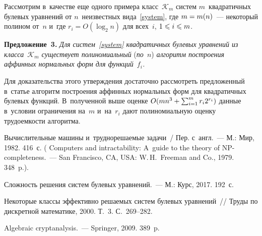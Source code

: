 \begin{multicols}{2}
Рассмотрим в~качестве еще одного примера класс~$\mathcal{K}_m$ систем 
$m$~квадратичных булевых уравнений от $n$~неизвестных вида~\eqref{system}, где 
$m\hm=m(n)$~--- некоторый полином от~$n$ и~где $r_i=
O(\log_2 n)$ для всех~$i$, $1\hm\leqslant i\hm\leqslant m$.


\vspace*{2pt}


\noindent
\textbf{Предложение~3.}
\textit{Для систем~\eqref{system} квадратичных булевых уравнений из 
класса~$\mathcal{K}_m$ существует полиномиальный} (\textit{по~$n$}) \textit{алгоритм построения 
аффинных нормальных форм для функций~$f_i$.}


\smallskip

Для доказательства этого утверждения достаточно рассмотреть предложенный 
в~статье алгоритм построения аффинных нормальных форм для квад\-ра\-тич\-ных булевых 
функций. В~полученной выше оценке  $O(mn^3\hm+\sum\nolimits_{i=1}^m r_i2^{r_i})$
данные в~условии ограничения на~$m$ и~на~$r_i$ дают полиномиальную оценку трудоемкости 
алгоритма.


\vspace*{-12pt}

{\small\frenchspacing
 {%
 \begin{thebibliography}{99}

        Вычислительные машины и~труднорешаемые задачи~/ Пер. с~англ.~---
        М.: Мир, 1982. 416~с.
        ( Computers and intractability: 
A~guide to the theory of NP-completeness.~--- San Francisco, CA, USA: W.\,H.~Freeman 
and Co., 1979. 348~p.).

        Сложность решения сис\-тем булевых уравнений.~---
        М.: Курс, 2017. 192~с.

        {Некоторые классы эффективно ре\-ша\-емых систем булевых уравнений}~//
        Труды по дискретной математике, 2000. Т.~3. С.~269--282.

        Algebraic cryptanalysis.~--- Springer, 2009. 389~p.


\end{thebibliography}}}
\end{multicols}
